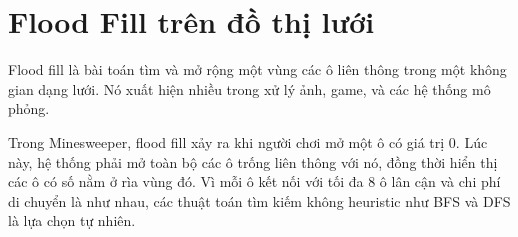 \section{Flood Fill trên đồ thị lưới}

Flood fill là bài toán tìm và mở rộng một vùng các ô liên thông trong một không gian dạng lưới. Nó xuất hiện nhiều trong xử lý ảnh, game, và các hệ thống mô phỏng.

Trong Minesweeper, flood fill xảy ra khi người chơi mở một ô có giá trị 0. Lúc này, hệ thống phải mở toàn bộ các ô trống liên thông với nó, đồng thời hiển thị các ô có số nằm ở rìa vùng đó. Vì mỗi ô kết nối với tối đa 8 ô lân cận và chi phí di chuyển là như nhau, các thuật toán tìm kiếm không heuristic như BFS và DFS là lựa chọn tự nhiên.
